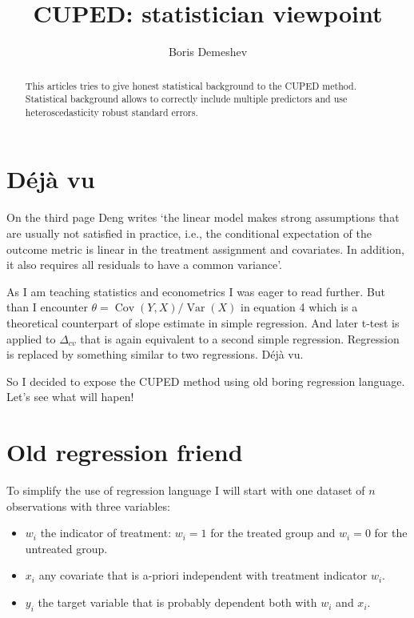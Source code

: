 \documentclass[10pt, a4paper]{article}
\title{CUPED: statistician viewpoint}
\author{Boris Demeshev}
\DeclareMathOperator{\Var}{Var}
\DeclareMathOperator{\Cov}{Cov}
\begin{document}
\begin{abstract}
    This articles tries to give honest statistical background to the CUPED method.
    Statistical background allows to correctly include multiple predictors and 
    use heteroscedasticity robust standard errors.
\end{abstract}


\maketitle

\section{Déjà vu}

On the third page Deng writes ‘the linear model makes strong assumptions that
are usually not satisfied in practice, i.e., the conditional expectation of the outcome metric is linear in the treatment
assignment and covariates. In addition, it also requires all
residuals to have a common variance’.

As I am teaching statistics and econometrics I was eager to read further. 
But than I encounter $\theta = \Cov(Y, X) / \Var(X)$ in equation 4 which is a theoretical
counterpart of slope estimate in simple regression. 
And later t-test is applied to $\Delta_{cv}$ that is again equivalent to a second simple regression.
Regression is replaced by something similar to two regressions. Déjà vu.

So I decided to expose the CUPED method using old boring regression language. 
Let's see what will hapen!

\section{Old regression friend}

To simplify the use of regression language I will start with one dataset of $n$ observations
with three variables:

\begin{itemize}
    \item $w_i$ the indicator of treatment: $w_i = 1$ for the treated group and $w_i=0$ for 
    the untreated group.
    \item $x_i$ any covariate that is a-priori independent with treatment indicator $w_i$.
    \item $y_i$ the target variable that is probably dependent both with $w_i$ and 
    $x_i$. 
\end{itemize}
\end{document}
